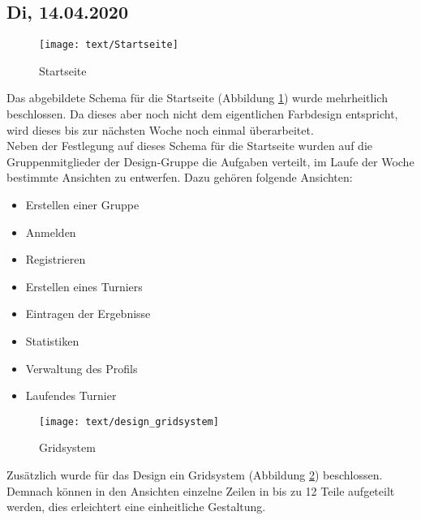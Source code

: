\subsection{Di, 14.04.2020}
	\begin{figure}[h!]
		\centering
		\texttt{[image: text/Startseite]}
		\caption{Startseite}
		\label{startseite}
	\end{figure}
Das abgebildete Schema für die Startseite (Abbildung \ref{startseite}) wurde mehrheitlich beschlossen. Da dieses aber noch nicht dem eigentlichen Farbdesign entspricht, wird dieses bis zur nächsten Woche noch einmal überarbeitet.\\
Neben der Festlegung auf dieses Schema für die Startseite wurden auf die Gruppenmitglieder der Design-Gruppe die Aufgaben verteilt, im Laufe der Woche bestimmte Ansichten zu entwerfen. Dazu gehören folgende Ansichten:\\
\begin{itemize}
	\item Erstellen einer Gruppe
	\item Anmelden
	\item Registrieren
	\item Erstellen eines Turniers
	\item Eintragen der Ergebnisse
	\item Statistiken
	\item Verwaltung des Profils
	\item Laufendes Turnier
\end{itemize}
\begin{figure}[h!]
		\centering
		\texttt{[image: text/design\_gridsystem]}
		\caption{Gridsystem}
		\label{gridsystem}
	\end{figure}
Zusätzlich wurde für das Design ein Gridsystem (Abbildung \ref{gridsystem}) beschlossen. Demnach können in den Ansichten einzelne Zeilen in bis zu 12 Teile aufgeteilt werden, dies erleichtert eine einheitliche Gestaltung.
